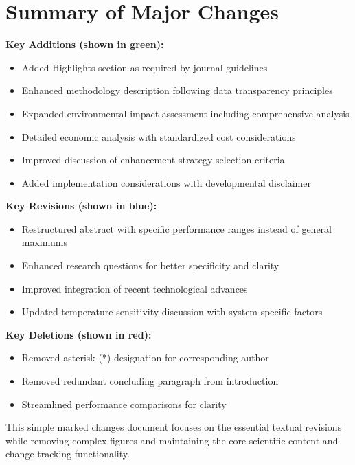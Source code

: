 \documentclass[12pt,a4paper]{article}
\begin{document}
\clearpage

\section*{Summary of Major Changes}

\textbf{Key Additions (shown in green):}
\begin{itemize}
\item Added Highlights section as required by journal guidelines
\item Enhanced methodology description following data transparency principles
\item Expanded environmental impact assessment including comprehensive analysis
\item Detailed economic analysis with standardized cost considerations
\item Improved discussion of enhancement strategy selection criteria
\item Added implementation considerations with developmental disclaimer
\end{itemize}

\textbf{Key Revisions (shown in blue):}
\begin{itemize}
\item Restructured abstract with specific performance ranges instead of general maximums
\item Enhanced research questions for better specificity and clarity
\item Improved integration of recent technological advances
\item Updated temperature sensitivity discussion with system-specific factors
\end{itemize}

\textbf{Key Deletions (shown in red):}
\begin{itemize}
\item Removed asterisk (*) designation for corresponding author
\item Removed redundant concluding paragraph from introduction
\item Streamlined performance comparisons for clarity
\end{itemize}

This simple marked changes document focuses on the essential textual revisions while removing complex figures and maintaining the core scientific content and change tracking functionality.



\end{document}
